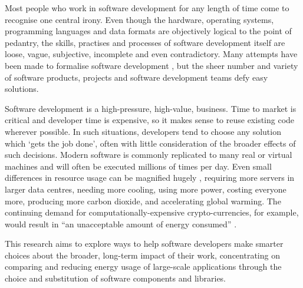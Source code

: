 Most people who work in software development for any length of time come to recognise one central irony. Even though the hardware, operating systems, programming languages and data formats are objectively logical to the point of pedantry, the skills, practises and processes of software development itself are loose, vague, subjective, incomplete and even contradictory. Many attempts have been made to formalise software development \citep{Glass2002}, but the sheer number and variety of software products, projects and software development teams defy easy solutions.

Software development is a high-pressure, high-value, business. Time to market is critical and developer time is expensive, so it makes sense to reuse existing code wherever possible. In such situations, developers tend to choose any solution which `gets the job done', often with little consideration of the broader effects of such decisions. Modern software is commonly replicated to many real or virtual machines and will often be executed millions of times per day. Even small differences in resource usage can be magnified hugely \citep{Vercauteren2007} \citep{Andreolini2006}, requiring more servers in larger data centres, needing more cooling, using more power, costing everyone more, producing more carbon dioxide, and accelerating global warming. The continuing demand for computationally-expensive crypto-currencies, for example, would result in \enquote{an unacceptable amount of energy consumed} \citep{Giungato2017}. 

This research aims to explore ways to help software developers make smarter choices about the broader, long-term impact of their work, concentrating on comparing and reducing energy usage of large-scale applications through the choice and substitution of software components and libraries.
